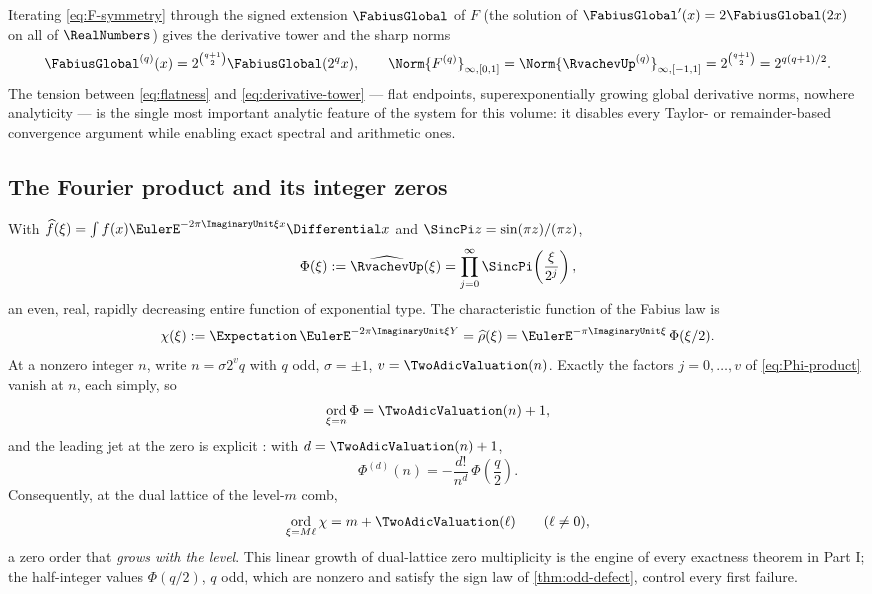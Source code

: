 \documentclass[11pt,oneside]{article}
\numberwithin{equation}{section}
\theoremstyle{definition}
\theoremstyle{remark}
\DeclareMathOperator{\ord}{ord}
\begin{document}
Iterating \eqref{eq:F-symmetry} through the signed extension
$\FabiusGlobal$ of $F$ (the solution of $\FabiusGlobal'(x)=2\FabiusGlobal(2x)$ on
all of $\RealNumbers$) gives the derivative tower and the sharp norms
\begin{equation}
 \FabiusGlobal^{(q)}(x)=2^{\binom{q+1}{2}}\FabiusGlobal(2^qx),
 \qquad
 \Norm{F^{(q)}}_{\infty,[0,1]}
 =\Norm{\RvachevUp^{(q)}}_{\infty,[-1,1]}
 =2^{\binom{q+1}{2}}=2^{q(q+1)/2}.
 \label{eq:derivative-tower}
\end{equation}
The tension between \eqref{eq:flatness} and
\eqref{eq:derivative-tower} --- flat endpoints, superexponentially
growing global derivative norms, nowhere analyticity --- is the single
most important analytic feature of the system for this volume: it
disables every Taylor- or remainder-based convergence argument while
enabling exact spectral and arithmetic ones.

\subsection{The Fourier product and its integer zeros}
\label{sec:fourier}

With $\widehat f(\xi)=\int f(x)\EulerE^{-2\pi\ImaginaryUnit\xi x}\Differential x$ and
$\SincPi z=\sin(\pi z)/(\pi z)$,
\begin{equation}
 \Phi(\xi):=\widehat{\RvachevUp}(\xi)
 =\prod_{j=0}^{\infty}\SincPi\!\left(\frac{\xi}{2^j}\right),
 \label{eq:Phi-product}
\end{equation}
an even, real, rapidly decreasing entire function of exponential type.
The characteristic function of the Fabius law is
\begin{equation}
 \chi(\xi):=\Expectation\,\EulerE^{-2\pi\ImaginaryUnit\xi Y}
 =\widehat\rho(\xi)
 =\EulerE^{-\pi\ImaginaryUnit\xi}\,\Phi(\xi/2).
 \label{eq:chi-Phi}
\end{equation}
At a nonzero integer $n$, write $n=\sigma2^{v}q$ with $q$ odd,
$\sigma=\pm1$, $v=\TwoAdicValuation(n)$.  Exactly the factors
$j=0,\dots,v$ of \eqref{eq:Phi-product} vanish at $n$, each simply, so
\begin{equation}
 \ord_{\xi=n}\Phi=\TwoAdicValuation(n)+1,
 \label{eq:Phi-zero-order}
\end{equation}
and the leading jet at the zero is explicit \cite{ProveItPrimary}:
with $d=\TwoAdicValuation(n)+1$,
\begin{equation}
 \Phi^{(d)}(n)
 =-\frac{d!}{n^{d}}\,\Phi\!\left(\frac q2\right).
 \label{eq:integer-leading-jet}
\end{equation}
Consequently, at the dual lattice of the level-$m$ comb,
\begin{equation}
 \ord_{\xi=M\ell}\chi=m+\TwoAdicValuation(\ell)
 \qquad(\ell\ne0),
 \label{eq:chi-zero-order}
\end{equation}
a zero order that \emph{grows with the level}.  This linear growth of
dual-lattice zero multiplicity is the engine of every exactness theorem
in Part I; the half-integer values $\Phi(q/2)$, $q$ odd, which are
nonzero and satisfy the sign law of \cref{thm:odd-defect}, control every
first failure.
\end{document}
